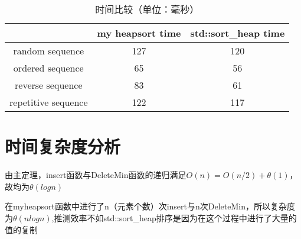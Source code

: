 \documentclass[UTF8]{ctexart}
\begin{document}
\begin{table}[!htp]
    \centering
    \caption{时间比较（单位：毫秒）} 
    \begin{tabular}{c|c|c}
        \hline
         \ & my heapsort time & std::sort\_heap time \\
        \hline
        random sequence & 127 & 120\\
        \hline
        ordered sequence & 65 & 56 \\
        \hline
        reverse sequence & 83 & 61 \\
        \hline
        repetitive sequence & 122 & 117 \\
        \hline
    \end{tabular}
 \end{table}




\section{时间复杂度分析}
由主定理，insert函数与DeleteMin函数的递归满足$O(n)=O(n/2)+\theta(1)$，故均为$\theta(logn)$

在myheapsort函数中进行了n（元素个数）次insert与n次DeleteMin，所以复杂度为$\theta(nlogn)$,推测效率不如std::sort\_heap排序是因为在这个过程中进行了大量的值的复制
\end{document}
